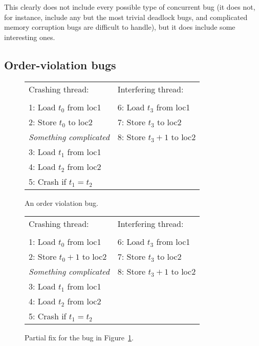 This clearly does not include every possible type of concurrent bug
(it does not, for instance, include any but the most trivial deadlock
bugs, and complicated memory corruption bugs are difficult to handle),
but it does include some interesting ones.

\subsection{Order-violation bugs}

\begin{figure}
\begin{centering}
\hfill
\begin{tabular}{p{8cm}l}
Crashing thread:\hfill         & Interfering thread: \\
\\
1: Load $t_0$ from loc1        & 6: Load $t_3$ from loc1 \\
2: Store $t_0$ to loc2         & 7: Store $t_3$ to loc2 \\
\textit{Something complicated} & 8: Store $t_3 + 1$ to loc2 \\
3: Load $t_1$ from loc1        & \\
4: Load $t_2$ from loc2        & \\
5: Crash if $t_1 = t_2$ & \\
\end{tabular}
\hfill
\end{centering}
\caption{An order violation bug.}
\label{fig:mandatory_concurrency1}
\end{figure}

\begin{figure}
\begin{centering}
\hfill
\begin{tabular}{p{8cm}l}
Crashing thread:          & Interfering thread: \\
\\
1: Load $t_0$ from loc1        & 6: Load $t_3$ from loc1 \\
2: Store $t_0+1$ to loc2       & 7: Store $t_3$ to loc2 \\
\textit{Something complicated} & 8: Store $t_3 + 1$ to loc2 \\
3: Load $t_1$ from loc1        & \\
4: Load $t_2$ from loc2        & \\
5: Crash if $t_1 = t_2$ & \\
\end{tabular}
\hfill
\end{centering}
\caption{Partial fix for the bug in Figure~\ref{fig:mandatory_concurrency1}.}
\label{fig:mandatory_concurrency2}
\end{figure}

